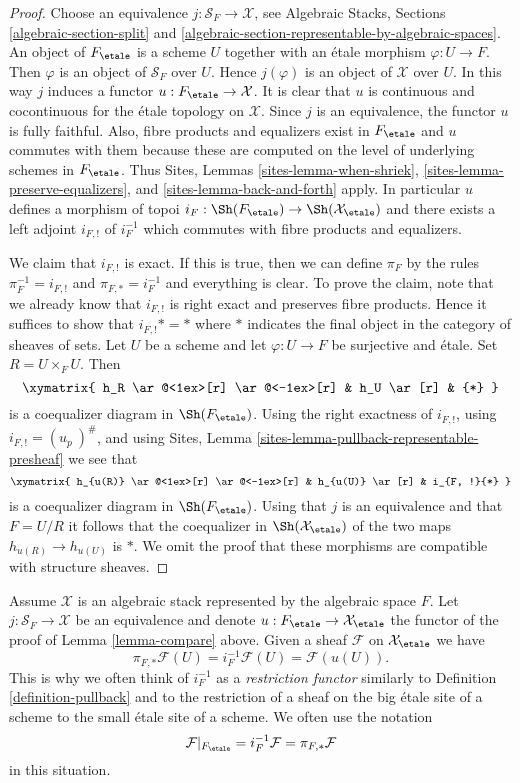 \begin{proof}
Choose an equivalence $j : \mathcal{S}_F \to \mathcal{X}$, see
Algebraic Stacks, Sections \ref{algebraic-section-split} and
\ref{algebraic-section-representable-by-algebraic-spaces}.
An object of $F_\etale$ is a scheme $U$ together with an
\'etale morphism $\varphi : U \to F$. Then $\varphi$ is an object
of $\mathcal{S}_F$ over $U$. Hence $j(\varphi)$ is an object of
$\mathcal{X}$ over $U$. In this way $j$ induces a functor
$u : F_\etale \to \mathcal{X}$. It is clear that
$u$ is continuous and cocontinuous for the \'etale topology on
$\mathcal{X}$. Since $j$ is an equivalence, the functor $u$ is fully
faithful. Also, fibre products and equalizers exist in $F_\etale$
and $u$ commutes with them because these are computed on the level
of underlying schemes in $F_\etale$. Thus
Sites, Lemmas \ref{sites-lemma-when-shriek},
\ref{sites-lemma-preserve-equalizers}, and
\ref{sites-lemma-back-and-forth}
apply. In particular $u$ defines a morphism of topoi
$i_F : \Sh(F_\etale) \to \Sh(\mathcal{X}_\etale)$
and there exists a left adjoint $i_{F, !}$ of $i_F^{-1}$ which commutes
with fibre products and equalizers.

\medskip\noindent
We claim that $i_{F, !}$ is exact. If this is true, then we can define
$\pi_F$ by the rules $\pi_F^{-1} = i_{F, !}$ and $\pi_{F, *} = i_F^{-1}$
and everything is clear. To prove the claim, note that we already know
that $i_{F, !}$
is right exact and preserves fibre products. Hence it suffices to show
that $i_{F, !}* = *$ where $*$ indicates the final object in the category
of sheaves of sets. Let $U$ be a scheme and let
$\varphi : U \to F$ be surjective and \'etale. Set $R = U \times_F U$.
Then
$$
\xymatrix{
h_R \ar@<1ex>[r] \ar@<-1ex>[r] & h_U \ar[r] & {*}
}
$$
is a coequalizer diagram in $\Sh(F_\etale)$. Using the
right exactness of $i_{F, !}$, using $i_{F, !} = (u_p\ )^\#$, and using
Sites, Lemma \ref{sites-lemma-pullback-representable-presheaf}
we see that
$$
\xymatrix{
h_{u(R)} \ar@<1ex>[r] \ar@<-1ex>[r] & h_{u(U)} \ar[r] & i_{F, !}{*}
}
$$
is a coequalizer diagram in $\Sh(F_\etale)$. Using that
$j$ is an equivalence and that $F = U/R$ it follows that
the coequalizer in $\Sh(\mathcal{X}_\etale)$ of the
two maps $h_{u(R)} \to h_{u(U)}$ is $*$. We omit the proof that
these morphisms are compatible with structure sheaves.
\end{proof}

\noindent
Assume $\mathcal{X}$ is an algebraic stack represented by the
algebraic space $F$.
Let $j : \mathcal{S}_F \to \mathcal{X}$ be an equivalence and denote
$u : F_\etale \to \mathcal{X}_\etale$ the
functor of the proof of Lemma \ref{lemma-compare} above.
Given a sheaf $\mathcal{F}$ on $\mathcal{X}_\etale$ we have
$$
\pi_{F, *}\mathcal{F}(U) = i_F^{-1}\mathcal{F}(U) = \mathcal{F}(u(U)).
$$
This is why we often think of $i_F^{-1}$ as a {\it restriction functor}
similarly to
Definition \ref{definition-pullback}
and to the restriction of a sheaf on the big \'etale site of
a scheme to the small \'etale site of a scheme. We often use the notation
\begin{equation}
\label{equation-restrict}
\mathcal{F}|_{F_\etale} = i_F^{-1}\mathcal{F} = \pi_{F, *}\mathcal{F}
\end{equation}
in this situation.

